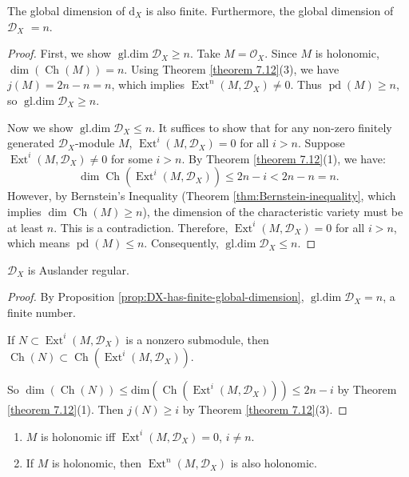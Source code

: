 \begin{proposition}\label{prop:DX-has-finite-global-dimension}
    The global dimension of $\mathrm{d}_X$ is also finite. Furthermore, the global dimension of $\mathcal{D}_X$ $=n$.
\end{proposition}
\begin{proof}
    First, we show $\operatorname{gl.dim}\mathcal{D}_X \ge n$. Take $M=\mathcal{O}_{X}$. Since $M$ is holonomic, $\dim(\operatorname{Ch}(M))=n$. Using Theorem \ref{theorem 7.12}(3), we have $j(M)=2n-n=n$, which implies $\operatorname{Ext}^n(M, \mathcal{D}_X) \neq 0$. Thus $\operatorname{pd}(M) \ge n$, so $\operatorname{gl.dim}\mathcal{D}_X \ge n$.

    Now we show $\operatorname{gl.dim}\mathcal{D}_X \le n$. It suffices to show that for any non-zero finitely generated $\mathcal{D}_X$-module $M$, $\operatorname{Ext}^i(M, \mathcal{D}_X) = 0$ for all $i > n$.
    Suppose $\operatorname{Ext}^i(M, \mathcal{D}_X) \neq 0$ for some $i > n$. By Theorem \ref{theorem 7.12}(1), we have:
    $$\dim \operatorname{Ch}(\operatorname{Ext}^i(M, \mathcal{D}_X)) \le 2n - i < 2n - n = n.$$
    However, by Bernstein's Inequality (Theorem \ref{thm:Bernstein-inequality}, which implies $\dim \operatorname{Ch}(M) \ge n$), the dimension of the characteristic variety must be at least $n$. This is a contradiction.
    Therefore, $\operatorname{Ext}^i(M, \mathcal{D}_X) = 0$ for all $i > n$, which means $\operatorname{pd}(M) \le n$. Consequently, $\operatorname{gl.dim}\mathcal{D}_X \le n$.
\end{proof}

\begin{theorem}
    $\mathcal{D}_{X}$ is Auslander regular.
\end{theorem}
\begin{proof}
    By Proposition \ref{prop:DX-has-finite-global-dimension}, $\operatorname{gl.dim}\mathcal{D}_X = n$, a finite number.

    If $N \subset \operatorname{Ext}^{i}(M, \mathcal{D}_X)$ is a nonzero submodule, then $\operatorname{Ch}(N)\subset\operatorname{Ch}(\operatorname{Ext}^{i}(M, \mathcal{D}_X))$.

    So $\dim(\operatorname{Ch}(N)) \leq \mathrm{dim}(\operatorname{Ch}(\operatorname{Ext}^{i}(M, \mathcal{D}_X)))\leq 2n - i$ by Theorem \ref{theorem 7.12}(1).
    Then $j(N) \geq i$ by Theorem \ref{theorem 7.12}(3).
\end{proof}

\begin{corollary}
    \quad
    \begin{enumerate}
        \item $M$ is holonomic iff $\operatorname{Ext}^i(M, \mathcal{D}_X) = 0$, $i \neq n$.
        \item If $M$ is holonomic, then $\operatorname{Ext}^n(M, \mathcal{D}_X)$ is also holonomic.
    \end{enumerate}
\end{corollary}
